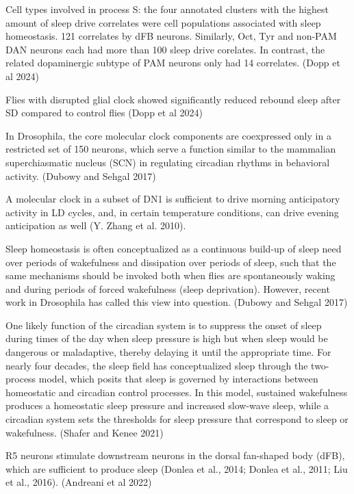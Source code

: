 \documentclass[12pt]{article}
\begin{document}
Cell types involved in process S: the four annotated clusters with the highest
amount of sleep drive correlates were cell populations associated with sleep homeostasis.
121 correlates by dFB neurons. Similarly, Oct, Tyr and non-PAM DAN
neurons each had more than 100 sleep drive corelates. In contrast, the related
dopaminergic subtype of PAM neurons only had 14 correlates.
(Dopp et al 2024)


Flies with disrupted glial clock showed significantly reduced rebound sleep after SD compared to control flies
(Dopp et al 2024)

In Drosophila, the core molecular clock components are coexpressed only in a restricted
set of 150 neurons, which serve a function similar to the mammalian superchiasmatic nucleus
(SCN) in regulating circadian rhythms in behavioral activity.
\parencite{dubowyCircadianRhythmsSleep2017} (Dubowy and Sehgal 2017)

A molecular clock in a subset of DN1 is sufficient to drive morning anticipatory activity
in LD cycles, and, in certain temperature conditions, can drive evening anticipation as well 
(Y. Zhang et al. 2010).

Sleep homeostasis is often conceptualized as a continuous build-up of sleep need over
periods of wakefulness and dissipation over periods of sleep, such that the same mechanisms
should be invoked both when flies are spontaneously waking and during periods of forced 
wakefulness (sleep deprivation). However, recent work in Drosophila has called this view 
into question.
\parencite{dubowyCircadianRhythmsSleep2017} (Dubowy and Sehgal 2017)


One likely function of the circadian system is to suppress the onset of
sleep during times of the day when sleep pressure is high but when sleep would be
dangerous or maladaptive, thereby delaying it until the appropriate time.
For nearly four decades, the sleep field has conceptualized sleep through the
two-process model, which posits that sleep is governed by interactions between
homeostatic and circadian control processes.
In this model, sustained wakefulness produces a homeostatic sleep pressure
and increased slow-wave sleep, while a circadian system sets the thresholds
for sleep pressure that correspond to sleep or wakefulness.
\parencite{shaferRegulationDrosophilaSleep2021} (Shafer and Kenee 2021)


\color{red}
R5 neurons stimulate downstream neurons in the dorsal fan-shaped body (dFB), which are 
sufficient to produce sleep (Donlea et al., 2014; Donlea et al., 2011; Liu et al., 2016).
\parencite{andreaniCircadianProgrammingEllipsoid2022} (Andreani et al 2022)
\end{document}
